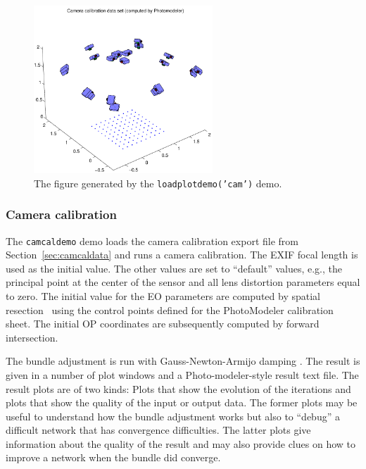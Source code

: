 \documentclass{article}
\begin{document}
\begin{figure}[tbp]
\centering
\includegraphics[width=0.6\textwidth]{./ill/ccam.pdf}
\caption{\label{fig:camcalib}
The figure generated by the \texttt{loadplotdemo('cam')} demo.}
\end{figure}

\subsubsection{Camera calibration}
\label{sec:org292595a}

The \texttt{camcaldemo} demo loads the camera calibration export file from
Section~\ref{sec:camcaldata} and runs a camera calibration. The
EXIF focal length is used as the initial value. The other values are
set to ``default'' values, e.g., the principal point at the center of
the sensor and all lens distortion parameters equal to zero. The
initial value for the EO parameters are computed by spatial
resection~\citep[Chap.~11.1.3.4]{Haralick1994:Review,McGlone2004:Manual}
using the control points defined for the PhotoModeler calibration
sheet. The initial OP coordinates are subsequently computed by forward
intersection.

The bundle adjustment is run with Gauss-Newton-Armijo damping
\citep{Borlin2013:Bundle}. The result is given in a number of plot
windows and a Photo-modeler-style result text file. The result plots
are of two kinds: Plots that show the evolution of the iterations and
plots that show the quality of the input or output data. The former
plots may be useful to understand how the bundle adjustment works but
also to ``debug'' a difficult network that has convergence
difficulties. The latter plots give information about the quality of
the result and may also provide clues on how to improve a network when
the bundle did converge.
\end{document}
